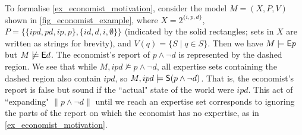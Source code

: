 
\def\w{1}
\def\h{0.4}
\newcommand{\examplemodel}{
    \tikzset{mynode/.style={color=black}}
    \node[mynode] (a) at (0, 0) {$ipd$};
    \node[mynode] (b) at (\w, 0) {$pd$};
    \node[mynode] (c) at (0, \h) {$ip$};
    \node[mynode] (d) at (\w, \h) {$p$};
    \node[mynode] (e) at (0, 2*\h) {$id$};
    \node[mynode] (f) at (\w, 2*\h) {$d$};
    \node[mynode] (g) at (0, 3*\h) {$i$};
    \node[mynode] (h) at (\w, 3*\h) {$\emptyset$};
}

\begin{example}
    \label{ex_economist_formalisation}

    To formalise \cref{ex_economist_motivation}, consider the model $M = (X, P,
    V)$ shown in \cref{fig_economist_example}, where $X =
    2^{\{i,p,d\}}$, $P = \{\{ipd,pd,ip,p\},
    \{id,d,i,\emptyset\}\}$ (indicated by the solid rectangles; sets in $X$ are
    written as strings for brevity), and $V(q) =
    \{S \mid q \in S\}$. Then we have $M \models \E p$ but $M \not\models \E
    d$. The economist's report of $p \land \neg d$ is represented by the dashed
    region. We see that while $M, ipd \not\models p \land \neg d$, all
    expertise sets containing the dashed region also contain $ipd$, so $M, ipd
    \models \S(p \land \neg d)$. That is, the economist's report is false but
    sound if the ``actual" state of the world were $ipd$. This act of
    ``expanding" $\|p \land \neg d\|$ until we reach an expertise set
    corresponds to ignoring the parts of the report on which the economist has
    no expertise, as in \cref{ex_economist_motivation}.

\end{example}


